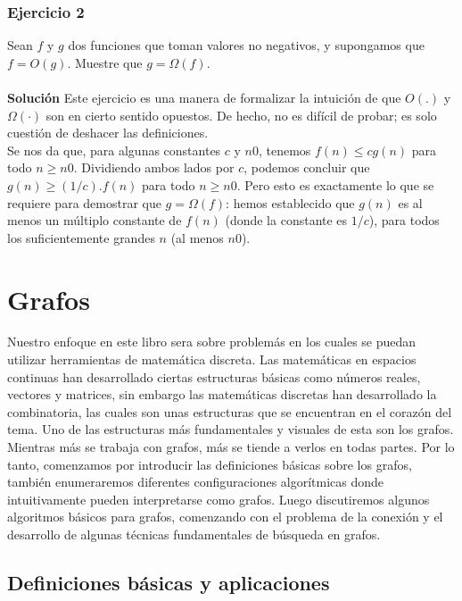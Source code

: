 \documentclass[a4paper]{article}
\begin{document}
\subsubsection*{Ejercicio 2} 

Sean $f$ y $g$ dos funciones que toman valores no negativos, y supongamos que $f=O(g)$. Muestre que $g=\Omega(f)$.\\\\
\textbf{Solución} Este ejercicio es una manera de formalizar la intuición de que $O(.)$ y $\Omega(·)$ son en cierto sentido opuestos. De hecho, no es difícil de probar; es solo cuestión de deshacer las definiciones.\\
Se nos da que, para algunas constantes $c$ y $n0$, tenemos $f(n)≤cg(n)$ para todo $n≥n0$. Dividiendo ambos lados por $c$, podemos concluir que $g(n)≥(1/c).f(n)$ para todo $n≥n0$. Pero esto es exactamente lo que se requiere para demostrar que $g=\Omega(f)$: hemos establecido que $g(n)$ es al menos un múltiplo constante de $f(n)$ (donde la constante es $1/c$), para todos los suficientemente grandes $n$ (al menos $n0$).\\


\newpage
\section{Grafos}

Nuestro enfoque en este libro sera sobre problemás en los cuales se puedan utilizar herramientas de matemática discreta. Las matemáticas en espacios continuas han desarrollado ciertas estructuras básicas como números reales, vectores y matrices, sin embargo las matemáticas discretas han desarrollado la combinatoria, las cuales son unas estructuras que se encuentran en el corazón del tema. Uno de las estructuras más fundamentales y visuales de esta son los grafos. \\

Mientras más se trabaja con grafos, más se tiende a verlos en todas partes.
Por lo tanto, comenzamos por introducir las definiciones básicas sobre los grafos, también enumeraremos diferentes configuraciones algorítmicas donde intuitivamente pueden interpretarse como grafos. Luego discutiremos algunos algoritmos básicos para grafos, comenzando
con el problema de la conexión y el desarrollo de algunas técnicas fundamentales de búsqueda en grafos.\\

\subsection{Definiciones básicas y aplicaciones}
\end{document}
